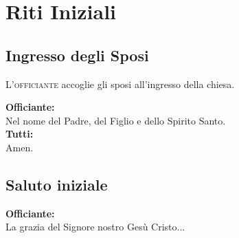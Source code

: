 \chapter{Riti Iniziali}

\section{Ingresso degli Sposi}

\lettrine[lines=2]{L}{'officiante} accoglie gli sposi all'ingresso della chiesa.

\textbf{Officiante:}\\
Nel nome del Padre, del Figlio e dello Spirito Santo.\\

\textbf{Tutti:}\\
Amen.

\section{Saluto iniziale}

\textbf{Officiante:}\\
La grazia del Signore nostro Gesù Cristo...